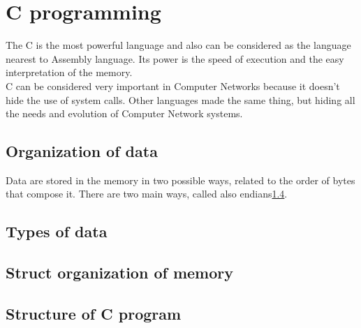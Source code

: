 \chapter{C programming}
The C is the most powerful language and also can be considered as the language nearest to Assembly language. Its power is the speed of execution and the easy interpretation of the memory.\\
C can be considered very important in Computer Networks because it doesn't hide the use of system calls. Other languages made the same thing, but hiding all the needs and evolution of Computer Network systems.

\section{Organization of data}\label{littleBig}
Data are stored in the memory in two possible ways, related to the order of bytes that compose it. There are two main ways, called also endians\ref{}.

\begin{comment}
\begin{figure}
\centering
\subfloat[][\emph{Mano con sfera riflettente}]{\texttt{[image: Sfera]}} 

\quad\subfloat[][\emph{Belvedere}]{\texttt{[image: Belvedere]}} \\
\caption{Esempio di figura composta da più sottofigure}\label{fig:subfig}\end{figure}
\end{comment}
 

\section{Types of data}


\section{Struct organization of memory}


\section{Structure of C program}
